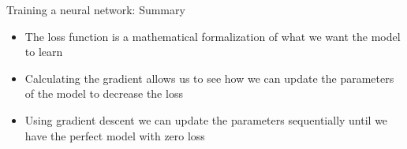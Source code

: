 \documentclass[t]{beamer}
\begin{document}
	\begin{frame}{Training a neural network: Summary}
		\centering
		\vfill
		\begin{itemize}
			\item The loss function is a mathematical formalization of what we want the model to learn
			\item Calculating the gradient allows us to see how we can update the parameters of the model to decrease the loss
			\item Using gradient descent we can update the parameters sequentially until we have the perfect model with zero loss
		\end{itemize}
		\vfill
	\end{frame}
\end{document}
